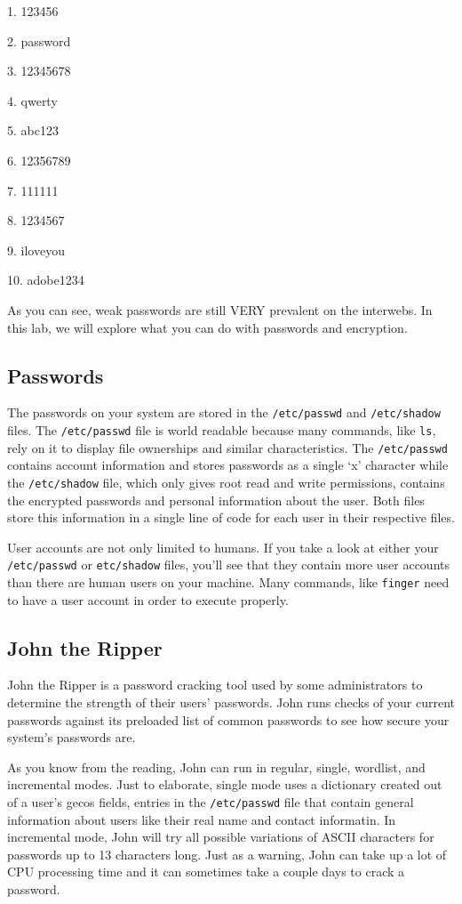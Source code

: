 \documentclass[11pt,a4paper]{article}
\begin{document}
1. 123456

2. password

3. 12345678

4. qwerty

5. abc123

6. 12356789

7. 111111

8. 1234567

9. iloveyou

10. adobe1234

As you can see, weak passwords are still VERY prevalent on the interwebs. In this lab, we will explore what you can do with passwords and encryption. 

\subsection*{Passwords}

\indent\indent The passwords on your system are stored in the \verb|/etc/passwd| and \verb|/etc/shadow| files. The \verb|/etc/passwd| file is world readable because many commands, like \verb|ls|, rely on it to display file ownerships and similar characteristics. The \verb|/etc/passwd| contains account information and stores passwords as a single `x' character while the \verb|/etc/shadow| file, which only gives root read and write permissions, contains the encrypted passwords and personal information about the user. Both files store this information in a single line of code for each user in their respective files.

User accounts are not only limited to humans. If you take a look at either your \verb|/etc/passwd| or \verb|etc/shadow| files, you'll see that they contain more user accounts than there are human users on your machine. Many commands, like \verb|finger| need to have a user account in order to execute properly. 


\subsection*{John the Ripper}

\indent\indent John the Ripper is a password cracking tool used by some administrators to determine the strength of their users' passwords.  John runs checks of your current passwords against its preloaded list of common passwords to see how secure your system's passwords are.

As you know from the reading, John can run in regular, single, wordlist, and incremental modes. Just to elaborate, single mode uses a dictionary created out of a user's gecos fields, entries in the \verb|/etc/passwd| file that contain general information about users like their real name and contact informatin. In incremental mode, John will try all possible variations of ASCII characters for passwords up to 13 characters long. Just as a warning, John can take up a lot of CPU processing time and it can sometimes take a couple days to crack a password. 
\end{document}
